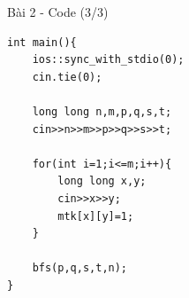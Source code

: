 \begin{frame}[fragile]{Bài 2 - Code (3/3)}

\begin{lstlisting}
int main(){
    ios::sync_with_stdio(0);
    cin.tie(0);

    long long n,m,p,q,s,t;
    cin>>n>>m>>p>>q>>s>>t;

    for(int i=1;i<=m;i++){
        long long x,y;
        cin>>x>>y;
        mtk[x][y]=1;
    }

    bfs(p,q,s,t,n);
}
\end{lstlisting}

\end{frame}
